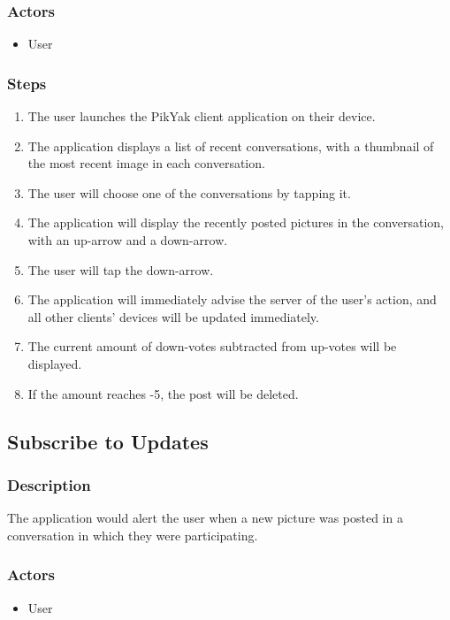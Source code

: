 \documentclass[11pt]{scrartcl}
\begin{document}
        \subsubsection{Actors}
            \begin{itemize}
                \item User
            \end{itemize}
        \subsubsection{Steps}
            \begin{enumerate}
                \item The user launches the PikYak client application on their device.
                \item The application displays a list of recent conversations, with a thumbnail of the most recent image in each conversation.
                \item The user will choose one of the conversations by tapping it.
                \item The application will display the recently posted pictures in the conversation, with an up-arrow and a down-arrow.
                \item The user will tap the down-arrow.
                \item The application will immediately advise the server of the user's action, and all other clients' devices will be updated immediately.
                \item The current amount of down-votes subtracted from up-votes will be displayed.
                \item If the amount reaches -5, the post will be deleted.
            \end{enumerate}

    \subsection{Subscribe to Updates}
        \subsubsection{Description}
            The application would alert the user when a new picture was posted in a conversation in which they were participating.
        \subsubsection{Actors}
            \begin{itemize}
                \item User
            \end{itemize}
\end{document}
